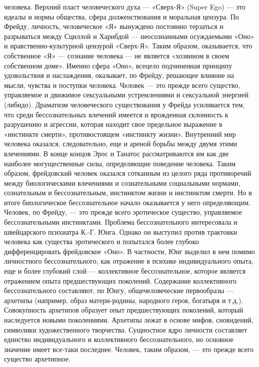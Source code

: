 \documentclass[12pt]{article}
\begin{document}
человека. Верхний пласт человеческого духа — «Сверх-Я» (Super Ego) — это идеалы и нормы общества, сфера
долженствования и моральная цензура. По Фрейду, личность, человеческое «Я» вынуждено постоянно
терзаться и разрываться между Сциллой и Харибдой — неосознанными осуждаемыми «Оно» и нравственно-культурной цензурой «Сверх-Я». Таким образом, оказывается, что собственное «Я» — сознание человека — не
является «хозяином в своем собственном доме». Именно сфера «Оно», всецело подчиненная принципу
удовольствия и наслаждения, оказывает, по Фрейду, решающее влияние на мысли, чувства и поступки человека.
Человек — это прежде всего существо, управляемое и движимое сексуальными устремлениями и сексуальной
энергией (либидо).
Драматизм человеческого существования у Фрейда усиливается тем, что среди бессознательных влечений
имеется и врожденная склонность к разрушению и агрессии, которая находит свое предельное выражение в
«инстинкте смерти», противостоящем «инстинкту жизни». Внутренний мир человека оказался, следовательно,
еще и ареной борьбы между двумя этими влечениями. В конце концов Эрос и Танатос рассматриваются им как
две наиболее могущественные силы, определяющие поведение человека.
Таким образом, фрейдовский человек оказался сотканным из целого ряда противоречий между биологическими
влечениями и сознательными социальными нормами, сознательным и бессознательным, инстинктом жизни и
инстинктом смерти. Но в итоге биологическое бессознательное начало оказывается у него определяющим.
Человек, по Фрейду, — это прежде всего эротическое существо, управляемое бессознательными инстинктами.
Проблема бессознательного интересовала и швейцарского психиатра К.-Г. Юнга. Однако он выступил против
трактовки человека как существа эротического и попытался более глубоко дифференцировать фрейдовское
«Оно». В частности, Юнг выделил в нем помимо личностного бессознательного, как отражение в психике
индивидуального опыта, еще и более глубокий слой — коллективное бессознательное, которое является 
отражением опыта предшествующих поколений. Содержание коллективного бессознательного составляют, по
Юнгу, общечеловеческие первообразы — архетипы (например, образ матери-родины, народного героя, богатыря
и т.д.). Совокупность архетипов образует опыт предшествующих поколений, который наследуется новыми
поколениями. Архетипы лежат в основе мифов, сновидений, символики художественного творчества.
Сущностное ядро личности составляет единство индивидуального и коллективного бессознательного, но
основное значение имеет все-таки последнее. Человек, таким образом, — это прежде всего существо
архетипное.
\end{document}
